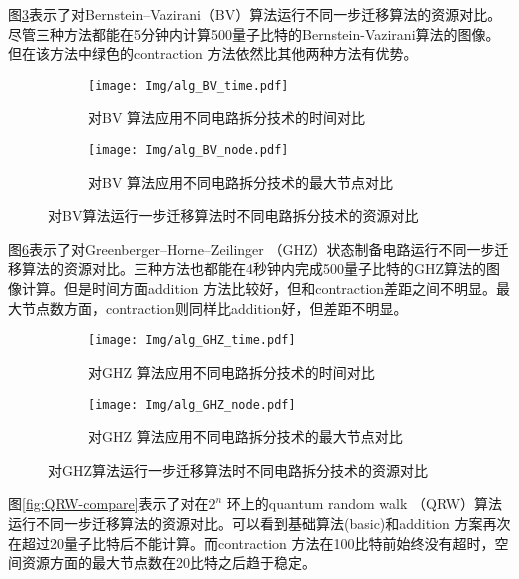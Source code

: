 图\ref{fig:BV-compare}表示了对Bernstein–Vazirani（BV）算法运行不同一步迁移算法的资源对比。尽管三种方法都能在5分钟内计算500量子比特的Bernstein-Vazirani算法的图像。但在该方法中绿色的contraction 方法依然比其他两种方法有优势。
\begin{figure}[!htbp]
    \centering
    \begin{subfigure}[b]{.45\textwidth}
        \centering
        \texttt{[image: Img/alg\_BV\_time.pdf]}
        \caption{对BV 算法应用不同电路拆分技术的时间对比}
        \label{fig:BV-time}
    \end{subfigure}
    \qquad
    \begin{subfigure}[b]{.45\textwidth}
        \centering
        \texttt{[image: Img/alg\_BV\_node.pdf]}
        \caption{对BV 算法应用不同电路拆分技术的最大节点对比}
        \label{fig:BV-node}
    \end{subfigure}
    \caption{对BV算法运行一步迁移算法时不同电路拆分技术的资源对比}
    \label{fig:BV-compare}
\end{figure}

图\ref{fig:GHZ-compare}表示了对Greenberger–Horne–Zeilinger （GHZ）状态制备电路运行不同一步迁移算法的资源对比。三种方法也都能在4秒钟内完成500量子比特的GHZ算法的图像计算。但是时间方面addition 方法比较好，但和contraction差距之间不明显。最大节点数方面，contraction则同样比addition好，但差距不明显。
\begin{figure}[!htbp]
    \centering
    \begin{subfigure}[b]{.45\textwidth}
        \centering
        \texttt{[image: Img/alg\_GHZ\_time.pdf]}
        \caption{对GHZ 算法应用不同电路拆分技术的时间对比}
        \label{fig:GHZ-time}
    \end{subfigure}
    \qquad
    \begin{subfigure}[b]{.45\textwidth}
        \centering
        \texttt{[image: Img/alg\_GHZ\_node.pdf]}
        \caption{对GHZ 算法应用不同电路拆分技术的最大节点对比}
        \label{fig:GHZ-node}
    \end{subfigure}
    \caption{对GHZ算法运行一步迁移算法时不同电路拆分技术的资源对比}
    \label{fig:GHZ-compare}
\end{figure}

图\ref{fig:QRW-compare}表示了对在$2^n$ 环上的quantum random walk （QRW）算法运行不同一步迁移算法的资源对比。可以看到基础算法(basic)和addition 方案再次在超过20量子比特后不能计算。而contraction 方法在100比特前始终没有超时，空间资源方面的最大节点数在20比特之后趋于稳定。

